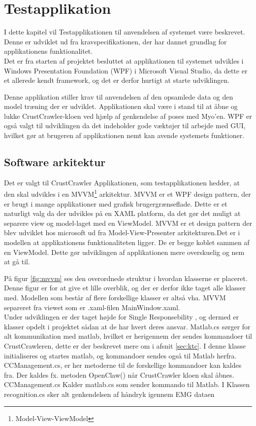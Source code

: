\thispagestyle{fancy}
\chapter{Testapplikation}
I dette kapitel vil Testapplikationen til anvendelsen af systemet være beskrevet. Denne er udviklet ud fra kravspecifikationen, der har dannet grundlag for applikationens funktionalitet.\\
Det er fra starten af projektet besluttet at applikationen til systemet udvikles i Windows Presentation Foundation (WPF) i Microsoft Visual Studio, da dette er et allerede kendt framework, og det er derfor hurtigt at starte udviklingen.

Denne applikation stiller krav til anvendelsen af den opsamlede data og den model træning der er udviklet. Applikationen skal være i stand til at åbne og lukke CrustCrawler-kloen ved hjælp af genkendelse af poses med Myo'en. WPF er også valgt til udviklingen da det indeholder gode væktøjer til arbejde med GUI, hvilket gør at brugeren af applikationen nemt kan avende systemets funktioner.

\section{Software arkitektur}
Det er valgt til CrustCrawler Applikationen, som testapplikationen hedder, at den skal udvikles i en MVVM\footnote{Model-View-ViewModel} arkitektur. MVVM er et WPF design pattern, der er brugt i mange applikationer med grafisk brugergrænseflade. Dette er et naturligt valg da der udvikles på en XAML platform, da det gør det muligt at separere view og model-laget med en ViewModel. MVVM er et design pattern der blev udviklet hos microsoft ud fra Model-View-Presenter arkitekturen.Det er i modellen at applikationens funktionaliteten ligger. De er begge koblet sammen af en ViewModel. Dette gør udviklingen af applikationen mere overskuelig og nem at gå til.


På figur \ref{fig:mvvm} ses den overordnede struktur i hvordan klasserne er placeret. Denne figur er for at give et lille overblik, og der er derfor ikke taget alle klasser med. Modellen som består af flere forskellige klasser er altså vha. MVVM separeret fra viewet som er .xaml-filen MainWindow.xaml.\\
Under udviklingen er der taget højde for Single Responsebility \cite{SingleRespons}, og dermed er klasser opdelt i projektet sådan at de har hvert deres ansvar. Matlab.cs sørger for alt kommunikation med matlab, hvilket er herigennem der sendes kommandoer til CrustCrawleren, dette er der beskrevet mere om i afsnit \ref{sec:ktc}. I denne klasse initialiseres og startes matlab, og kommandoer sendes også til Matlab herfra. CCManagement.cs, er her metoderne til de forskellige kommandoer kan kaldes fra. Der kaldes fx. metoden OpenClaw() når CrustCrawler kloen skal åbnes. CCManagement.cs Kalder matlab.cs som sender kommando til Matlab. I Klassen recognition.cs sker alt genkendelsen af håndryk igennem EMG dataen

